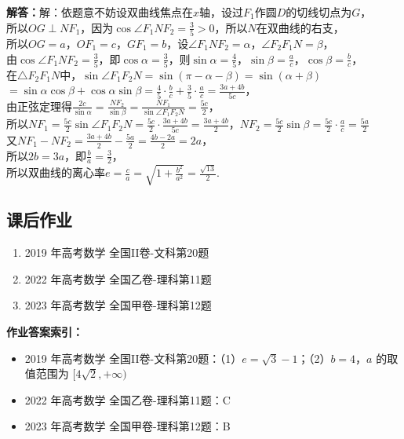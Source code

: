 \documentclass[UTF8,a4paper,11pt]{ctexart}
\begin{document}
\textbf{解答：}解：依题意不妨设双曲线焦点在$x$轴，设过$F_1$作圆$D$的切线切点为$G$，\\所以$OG \perp NF_1$，因为$\cos\angle F_1NF_2 = \frac{3}{5} > 0$，所以$N$在双曲线的右支，\\所以$OG = a$，$OF_1 = c$，$GF_1 = b$，设$\angle F_1NF_2 = \alpha$，$\angle F_2F_1N = \beta$，\\由$\cos\angle F_1NF_2 = \frac{3}{5}$，即$\cos\alpha = \frac{3}{5}$，则$\sin\alpha = \frac{4}{5}$，$\sin\beta = \frac{a}{c}$，$\cos\beta = \frac{b}{c}$，\\在$\triangle F_2F_1N$中，$\sin\angle F_1F_2N = \sin(\pi-\alpha-\beta) = \sin(\alpha+\beta)$\\$= \sin\alpha\cos\beta + \cos\alpha\sin\beta = \frac{4}{5}\cdot\frac{b}{c} + \frac{3}{5}\cdot\frac{a}{c} = \frac{3a+4b}{5c}$，\\由正弦定理得$\frac{2c}{\sin\alpha} = \frac{NF_2}{\sin\beta} = \frac{NF_1}{\sin\angle F_1F_2N} = \frac{5c}{2}$，\\所以$NF_1 = \frac{5c}{2}\sin\angle F_1F_2N = \frac{5c}{2}\cdot\frac{3a+4b}{5c} = \frac{3a+4b}{2}$，$NF_2 = \frac{5c}{2}\sin\beta = \frac{5c}{2}\cdot\frac{a}{c} = \frac{5a}{2}$\\又$NF_1 - NF_2 = \frac{3a+4b}{2} - \frac{5a}{2} = \frac{4b-2a}{2} = 2a$，\\所以$2b = 3a$，即$\frac{b}{a} = \frac{3}{2}$，\\所以双曲线的离心率$e = \frac{c}{a} = \sqrt{1+\frac{b^2}{a^2}} = \frac{\sqrt{13}}{2}$.

\subsection*{课后作业}

\begin{enumerate}

\item 2019 年高考数学 全国II卷-文科第20题

\item 2022 年高考数学 全国乙卷-理科第11题

\item 2023 年高考数学 全国甲卷-理科第12题

\end{enumerate}

\noindent\textbf{作业答案索引：}

\begin{itemize}

\item 2019 年高考数学 全国II卷-文科第20题：（1）$e=\sqrt{3}-1$；（2）$b=4$，$a$ 的取值范围为 $[4\sqrt{2},+\infty)$

\item 2022 年高考数学 全国乙卷-理科第11题：C

\item 2023 年高考数学 全国甲卷-理科第12题：B

\end{itemize}
\end{document}
